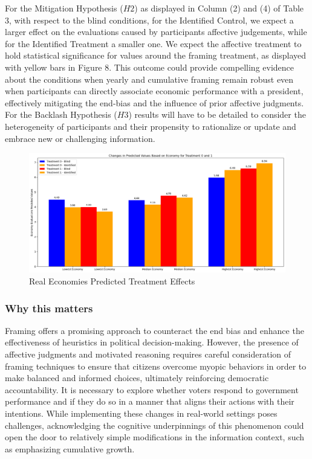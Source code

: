\documentclass[
]{article}
\begin{document}
For the Mitigation Hypothesis (\(H2\)) as displayed in Column (2) and
(4) of Table 3, with respect to the blind conditions, for the Identified
Control, we expect a larger effect on the evaluations caused by
participants affective judgements, while for the Identified Treatment a
smaller one. We expect the affective treatment to hold statistical
significance for values around the framing treatment, as displayed with
yellow bars in Figure 8. This outcome could provide compelling evidence
about the conditions when yearly and cumulative framing remain robust
even when participants can directly associate economic performance with
a president, effectively mitigating the end-bias and the influence of
prior affective judgments. For the Backlash Hypothesis (\(H3\)) results
will have to be detailed to consider the heterogeneity of participants
and their propensity to rationalize or update and embrace new or
challenging information.

\begin{figure}
\hypertarget{fig:label}{%
\centering
\includegraphics[width=1\textwidth,height=1\textheight]{pred_low.png}
\caption{Real Economies Predicted Treatment Effects}\label{fig:label}
}
\end{figure}

\hypertarget{why-this-matters}{%
\subsubsection{Why this matters}\label{why-this-matters}}

Framing offers a promising approach to counteract the end bias and
enhance the effectiveness of heuristics in political decision-making.
However, the presence of affective judgments and motivated reasoning
requires careful consideration of framing techniques to ensure that
citizens overcome myopic behaviors in order to make balanced and
informed choices, ultimately reinforcing democratic accountability. It
is necessary to explore whether voters respond to government performance
and if they do so in a manner that aligns their actions with their
intentions. While implementing these changes in real-world settings
poses challenges, acknowledging the cognitive underpinnings of this
phenomenon could open the door to relatively simple modifications in the
information context, such as emphasizing cumulative growth.
\end{document}
